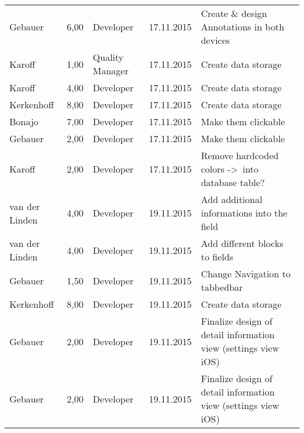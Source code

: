\begin{longtable}{ l r p{2cm} c p{4cm} }
		Gebauer                 & 6,00           & Developer             & 17.11.2015    & Create \& design Annotations in both devices                                    \\
		Karoff                  & 1,00           & Quality Manager       & 17.11.2015    & Create data storage                                                             \\
		Karoff                  & 4,00           & Developer             & 17.11.2015    & Create data storage                                                             \\
		Kerkenhoff              & 8,00           & Developer             & 17.11.2015    & Create data storage                                                             \\
		Bonajo                  & 7,00           & Developer             & 17.11.2015    & Make them clickable                                                             \\
		Gebauer                 & 2,00           & Developer             & 17.11.2015    & Make them clickable                                                             \\
		Karoff                  & 2,00           & Developer             & 17.11.2015    & Remove hardcoded colors -\textgreater\ into database table?                      \\
		van der Linden          & 4,00           & Developer             & 19.11.2015    & Add additional informations into the field                                      \\
		van der Linden          & 4,00           & Developer             & 19.11.2015    & Add different blocks to fields                                                  \\
		Gebauer                 & 1,50           & Developer             & 19.11.2015    & Change Navigation to tabbedbar                                                  \\
		Kerkenhoff              & 8,00           & Developer             & 19.11.2015    & Create data storage                                                             \\
		Gebauer                 & 2,00           & Developer             & 19.11.2015    & Finalize design of detail information view (settings view iOS)                  \\
		Gebauer                 & 2,00           & Developer             & 19.11.2015    & Finalize design of detail information view (settings view iOS)                  \\

\end{longtable}
